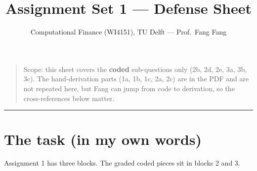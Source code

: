 \documentclass[
  11pt,
]{article}
\title{Assignment Set 1 --- Defense Sheet}
\author{Computational Finance (WI4151), TU Delft --- Prof.~Fang Fang}
\date{}
\begin{document}
\maketitle

{
\hypersetup{linkcolor=blue}
\setcounter{tocdepth}{3}
\tableofcontents
}
\begin{quote}
Scope: this sheet covers the \textbf{coded} sub-questions only (2b, 2d,
2e, 3a, 3b, 3c). The hand-derivation parts (1a, 1b, 1c, 2a, 2c) are in
the PDF and are not repeated here, but Fang can jump from code to
derivation, so the cross-references below matter.
\end{quote}

\begin{center}\rule{0.5\linewidth}{0.5pt}\end{center}

\hypertarget{the-task-in-my-own-words}{%
\section{The task (in my own words)}\label{the-task-in-my-own-words}}

Assignment 1 has three blocks. The graded coded pieces sit in blocks 2
and 3.
\end{document}
